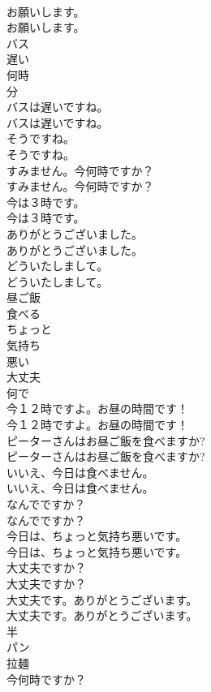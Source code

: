 \documentclass[8pt]{extreport}
\begin{document}
\begin{CJK}{UTF8}{min}
\\	お願いします。	
\\	お願いします。 
\\	バス
\\	遅い
\\	何時
\\	分
\\	バスは遅いですね。	
\\	バスは遅いですね。 
\\	そうですね。	
\\	そうですね。 
\\	すみません。今何時ですか？	
\\	すみません。今何時ですか？ 
\\	今は３時です。	
\\	今は３時です。 
\\	ありがとうございました。	
\\	ありがとうございました。 
\\	どういたしまして。	
\\	どういたしまして。 
\\	昼ご飯
\\	食べる
\\	ちょっと
\\	気持ち
\\	悪い
\\	大丈夫
\\	何で
\\	今１２時ですよ。お昼の時間です！	
\\	今１２時ですよ。お昼の時間です！ 
\\	ピーターさんはお昼ご飯を食べますか?	
\\	ピーターさんはお昼ご飯を食べますか? 
\\	いいえ、今日は食べません。	
\\	いいえ、今日は食べません。 
\\	なんでですか？	
\\	なんでですか？ 
\\	今日は、ちょっと気持ち悪いです。	
\\	今日は、ちょっと気持ち悪いです。 
\\	大丈夫ですか？	
\\	大丈夫ですか？ 
\\	大丈夫です。ありがとうございます。	
\\	大丈夫です。ありがとうございます。 
\\	半
\\	パン
\\	拉麺
\\	今何時ですか？	

\end{CJK}
\end{document}
